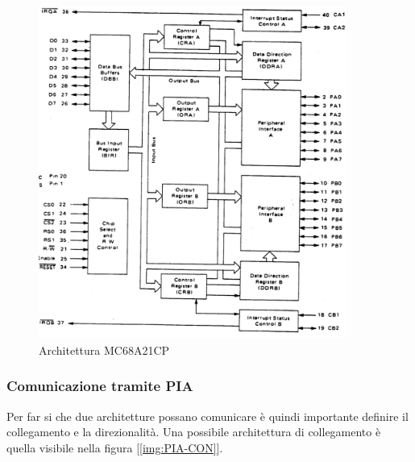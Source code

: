 \begin{figure}[ht]
    \centering
    \includegraphics[width=0.9\textwidth]{img/PIA-SCHEME.jpg}
    \caption{Architettura MC68A21CP} \label{img:PIA}
\end{figure}

\subsubsection{Comunicazione tramite PIA}
Per far si che due architetture possano comunicare è quindi importante definire il collegamento e la direzionalità. Una possibile architettura di collegamento è quella visibile nella figura [\ref{img:PIA-CON}].

